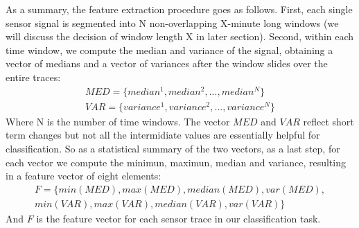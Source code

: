 As a summary, the feature extraction procedure goes as follows. First, each single sensor signal is segmented into N non-overlapping X-minute long windows (we will discuss the decision of window length X in later section). Second, within each time window, we compute the median and variance of the signal, obtaining a vector of medians and a vector of variances after the window slides over the entire traces: 
\begin{displaymath}
\begin{split}
MED = \{median^{1}, median^{2}, ..., median^{N}\}\\
VAR = \{variance^{1}, variance^{2}, ..., variance^{N}\}
\end{split}
\end{displaymath}
Where N is the number of time windows. The vector $MED$ and $VAR$ reflect short term changes but not all the intermidiate values are essentially helpful for classification. So as a statistical summary of the two vectors, as a last step, for each vector we compute the minimun, maximun, median and variance, resulting in a feature vector of eight elements:
\begin{displaymath}
\begin{split}
F = \{min(MED), max(MED), median(MED), var(MED),\\
 min(VAR), max(VAR), median(VAR), var(VAR)\}
\end{split}
\end{displaymath}
And $F$ is the feature vector for each sensor trace in our classification task.

